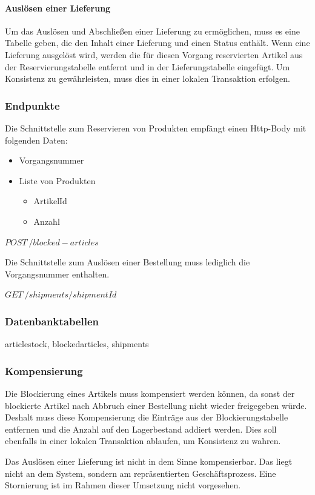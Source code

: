 \paragraph{Auslösen einer Lieferung}
Um das Auslösen und Abschließen einer Lieferung zu ermöglichen, muss es eine Tabelle geben, die den Inhalt einer Lieferung und einen Status enthält.
Wenn eine Lieferung ausgelöst wird, werden die für diesen Vorgang reservierten Artikel aus der Reservierungstabelle entfernt und in der Lieferungstabelle eingefügt. Um Konsistenz zu gewährleisten, muss dies in einer lokalen Transaktion erfolgen. 

\subsubsection{Endpunkte}
Die Schnittstelle zum Reservieren von Produkten empfängt einen Http-Body mit folgenden Daten:
\begin{itemize}
	\item Vorgangsnummer
	\item Liste von Produkten
	\begin{itemize}
		\item ArtikelId
		\item Anzahl
	\end{itemize}
\end{itemize}

$POST \ /blocked-articles$

Die Schnittstelle zum Auslösen einer Bestellung muss lediglich die Vorgangsnummer enthalten. 

$GET \ /shipments/{shipmentId}$

\subsubsection{Datenbanktabellen}
articlestock, blockedarticles, shipments

\subsubsection{Kompensierung}
Die Blockierung eines Artikels muss kompensiert werden können, da sonst der blockierte Artikel nach Abbruch einer Bestellung nicht wieder freigegeben würde. Deshalt muss diese Kompensierung die Einträge aus der Blockierungstabelle entfernen und die Anzahl auf den Lagerbestand addiert werden. Dies soll ebenfalls in einer lokalen Transaktion ablaufen, um Konsistenz zu wahren.

Das Auslösen einer Lieferung ist nicht in dem Sinne kompensierbar. Das liegt nicht an dem System, sondern am repräsentierten Geschäftsprozess. Eine Stornierung ist im Rahmen dieser Umsetzung nicht vorgesehen. 

